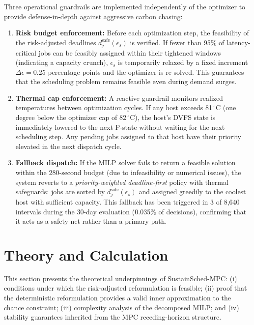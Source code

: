 \documentclass[a4paper,fleqn]{cas-dc}
\begin{document}
Three operational guardrails are implemented independently of the optimizer to provide defense-in-depth against aggressive carbon chasing:

\begin{enumerate}
  \item \textbf{Risk budget enforcement:} Before each optimization step, the feasibility of the risk-adjusted deadlines $d^{\mathrm{safe}}_j(\epsilon_s)$ is verified. If fewer than 95\% of latency-critical jobs can be feasibly assigned within their tightened windows (indicating a capacity crunch), $\epsilon_s$ is temporarily relaxed by a fixed increment $\Delta\epsilon = 0.25$ percentage points and the optimizer is re-solved. This guarantees that the scheduling problem remains feasible even during demand surges.

  \item \textbf{Thermal cap enforcement:} A reactive guardrail monitors realized temperatures between optimization cycles. If any host exceeds 81$\,^\circ$C (one degree below the optimizer cap of 82$\,^\circ$C), the host's DVFS state is immediately lowered to the next P-state without waiting for the next scheduling step. Any pending jobs assigned to that host have their priority elevated in the next dispatch cycle.

  \item \textbf{Fallback dispatch:} If the MILP solver fails to return a feasible solution within the 280-second budget (due to infeasibility or numerical issues), the system reverts to a \emph{priority-weighted deadline-first} policy with thermal safeguards: jobs are sorted by $d^{\mathrm{safe}}_j(\epsilon_s)$ and assigned greedily to the coolest host with sufficient capacity. This fallback has been triggered in 3 of 8,640 intervals during the 30-day evaluation (0.035\% of decisions), confirming that it acts as a safety net rather than a primary path.
\end{enumerate}
\section{Theory and Calculation}
\label{sec:theory}

This section presents the theoretical underpinnings of SustainSched-MPC: (i) conditions under which the risk-adjusted reformulation is feasible; (ii) proof that the deterministic reformulation provides a valid inner approximation to the chance constraint; (iii) complexity analysis of the decomposed MILP; and (iv) stability guarantees inherited from the MPC receding-horizon structure.
\end{document}
